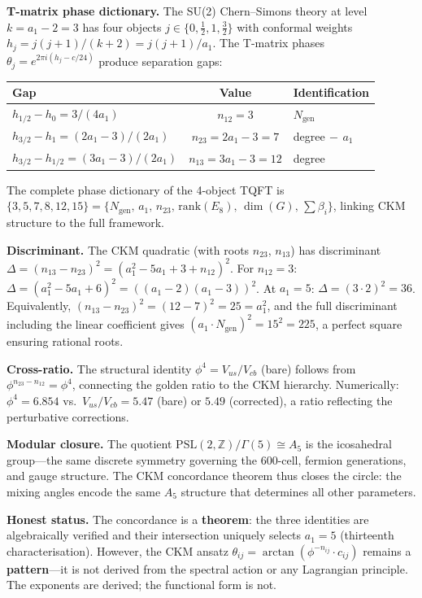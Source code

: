 \documentclass[12pt,a4paper]{article}
\theoremstyle{definition}
\begin{document}
\textbf{T-matrix phase dictionary.}  The SU(2) Chern--Simons theory at level $k = a_1 - 2 = 3$ has four objects $j \in \{0, \tfrac{1}{2}, 1, \tfrac{3}{2}\}$ with conformal weights $h_j = j(j+1)/(k+2) = j(j+1)/a_1$.  The T-matrix phases $\theta_j = e^{2\pi i(h_j - c/24)}$ produce separation gaps:
\begin{center}
\begin{tabular}{lcl}
\toprule
\textbf{Gap} & \textbf{Value} & \textbf{Identification} \\
\midrule
$h_{1/2} - h_0 = 3/(4a_1)$ & $n_{12} = 3$ & $N_{\text{gen}}$ \\
$h_{3/2} - h_1 = (2a_1-3)/(2a_1)$ & $n_{23} = 2a_1-3 = 7$ & degree$\,-\,a_1$ \\
$h_{3/2} - h_{1/2} = (3a_1-3)/(2a_1)$ & $n_{13} = 3a_1-3 = 12$ & degree \\
\bottomrule
\end{tabular}
\end{center}
The complete phase dictionary of the 4-object TQFT is $\{3, 5, 7, 8, 12, 15\} = \{N_{\text{gen}},\, a_1,\, n_{23},\, \mathrm{rank}(E_8),\, \dim(G),\, \sum\beta_i\}$, linking CKM structure to the full framework.

\textbf{Discriminant.}  The CKM quadratic (with roots $n_{23}$, $n_{13}$) has discriminant $\Delta = (n_{13} - n_{23})^2 = (a_1^2 - 5a_1 + 3 + n_{12})^2$.  For $n_{12} = 3$: $\Delta = (a_1^2 - 5a_1 + 6)^2 = ((a_1-2)(a_1-3))^2$.  At $a_1 = 5$: $\Delta = (3 \cdot 2)^2 = 36$.  Equivalently, $(n_{13} - n_{23})^2 = (12-7)^2 = 25 = a_1^2$, and the full discriminant including the linear coefficient gives $(a_1 \cdot N_{\text{gen}})^2 = 15^2 = 225$, a perfect square ensuring rational roots.

\textbf{Cross-ratio.}  The structural identity $\phi^4 = V_{us}/V_{cb}$ (bare) follows from $\phi^{n_{23} - n_{12}} = \phi^4$, connecting the golden ratio to the CKM hierarchy.  Numerically: $\phi^4 = 6.854$ vs.\ $V_{us}/V_{cb} = 5.47$ (bare) or $5.49$ (corrected), a ratio reflecting the perturbative corrections.

\textbf{Modular closure.}  The quotient $\mathrm{PSL}(2,\mathbb{Z})/\Gamma(5) \cong A_5$ is the icosahedral group---the same discrete symmetry governing the 600-cell, fermion generations, and gauge structure.  The CKM concordance theorem thus closes the circle: the mixing angles encode the same $A_5$ structure that determines all other parameters.

\textbf{Honest status.}  The concordance is a \textbf{theorem}: the three identities are algebraically verified and their intersection uniquely selects $a_1 = 5$ (thirteenth characterisation).  However, the CKM ansatz $\theta_{ij} = \arctan(\phi^{-n_{ij}} \cdot c_{ij})$ remains a \textbf{pattern}---it is not derived from the spectral action or any Lagrangian principle.  The exponents are derived; the functional form is not.
\end{document}
